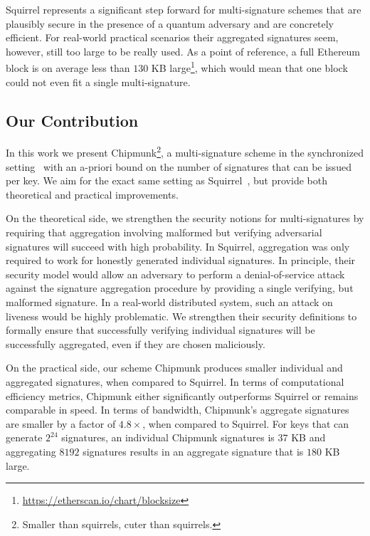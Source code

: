 Squirrel represents a significant step forward for multi-signature schemes that are plausibly secure in the presence of a quantum adversary and are concretely efficient.
For real-world practical scenarios their aggregated signatures seem, however, still too large to be really used.
As a point of reference, a full Ethereum block is on average less than $130$ KB large\footnote{\url{https://etherscan.io/chart/blocksize}}, which would mean that one block could not even fit a single multi-signature.

\subsection{Our Contribution}
In this work we present Chipmunk\footnote{Smaller than squirrels, cuter than squirrels.}, a multi-signature scheme in the synchronized setting~\cite{PKC:GenRam06,CCS:AhnGreHoh10,EC:HohWat18,USENIX:DGNW20} with an a-priori bound on the number of signatures that can be issued per key. 
We aim for the exact same setting as Squirrel~\cite{CCS:FleSimZha22}, but provide both theoretical and practical improvements.

On the theoretical side, we strengthen the security notions for multi-signatures by requiring that aggregation involving malformed but verifying adversarial signatures will succeed with high probability. 
In Squirrel, aggregation was only required to work for honestly generated individual signatures. 
In principle, their security model would allow an adversary to perform a denial-of-service attack against the signature aggregation procedure by providing a single verifying, but malformed signature.
In a real-world distributed system, such an attack on liveness would be highly problematic.
We strengthen their security definitions to formally ensure that successfully verifying individual signatures will be successfully aggregated, even if they are chosen maliciously. 

On the practical side, our scheme Chipmunk produces smaller individual and aggregated signatures, when compared to Squirrel.
In terms of computational efficiency metrics, Chipmunk either significantly outperforms Squirrel or remains comparable in speed.
In terms of bandwidth, Chipmunk's aggregate signatures are smaller by a factor of $4.8\times$, when compared to Squirrel.
For keys that can generate $2^{24}$ signatures, an individual Chipmunk signatures is $37$ KB and aggregating $8192$ signatures results in an aggregate signature that is $180$ KB large. 

